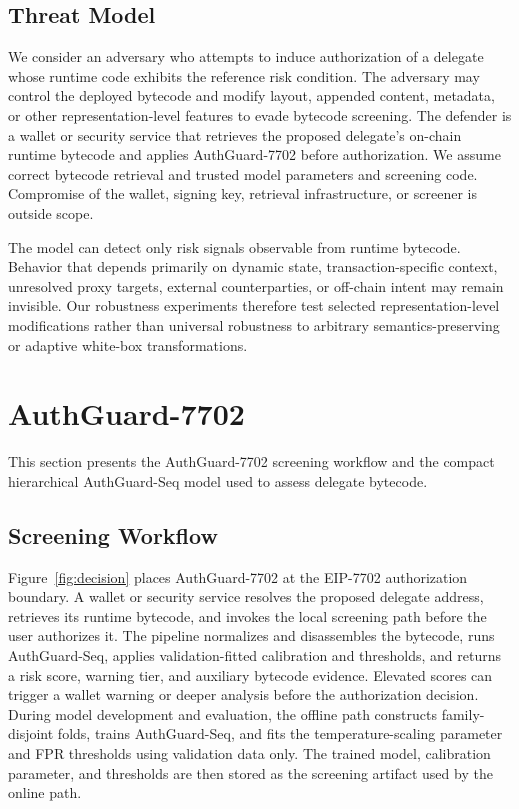 \documentclass[conference]{IEEEtran}
\begin{document}
\subsection{Threat Model}

We consider an adversary who attempts to induce authorization of a delegate whose runtime code exhibits the reference risk condition. The adversary may control the deployed bytecode and modify layout, appended content, metadata, or other representation-level features to evade bytecode screening. The defender is a wallet or security service that retrieves the proposed delegate's on-chain runtime bytecode and applies AuthGuard-7702 before authorization. We assume correct bytecode retrieval and trusted model parameters and screening code. Compromise of the wallet, signing key, retrieval infrastructure, or screener is outside scope.

The model can detect only risk signals observable from runtime bytecode. Behavior that depends primarily on dynamic state, transaction-specific context, unresolved proxy targets, external counterparties, or off-chain intent may remain invisible. Our robustness experiments therefore test selected representation-level modifications rather than universal robustness to arbitrary semantics-preserving or adaptive white-box transformations.



\section{AuthGuard-7702}
\label{sec:system}
This section presents the AuthGuard-7702 screening workflow and the compact hierarchical AuthGuard-Seq model used to assess delegate bytecode.



\subsection{Screening Workflow}

Figure~\ref{fig:decision} places AuthGuard-7702 at the EIP-7702 authorization boundary. A wallet or security service resolves the proposed delegate address, retrieves its runtime bytecode, and invokes the local screening path before the user authorizes it. The pipeline normalizes and disassembles the bytecode, runs AuthGuard-Seq, applies validation-fitted calibration and thresholds, and returns a risk score, warning tier, and auxiliary bytecode evidence. Elevated scores can trigger a wallet warning or deeper analysis before the authorization decision. During model development and evaluation, the offline path constructs family-disjoint folds, trains AuthGuard-Seq, and fits the temperature-scaling parameter and FPR thresholds using validation data only. The trained model, calibration parameter, and thresholds are then stored as the screening artifact used by the online path.
\end{document}

